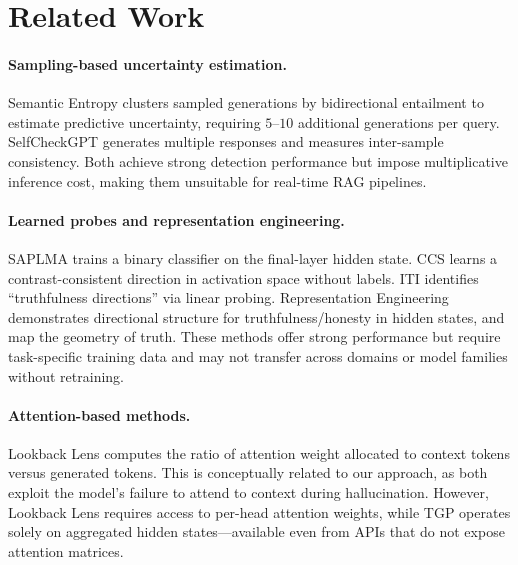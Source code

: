 \documentclass[10pt]{article}
\newcommand{\tgp}{\textsc{TGP}\xspace}
\begin{document}
\section{Related Work}
\label{sec:related}

\paragraph{Sampling-based uncertainty estimation.}
Semantic Entropy \citep{kuhn2023semantic} clusters sampled generations by bidirectional entailment to estimate predictive uncertainty, requiring $5$--$10$ additional generations per query.
SelfCheckGPT \citep{manakul2023selfcheckgpt} generates multiple responses and measures inter-sample consistency.
Both achieve strong detection performance but impose multiplicative inference cost, making them unsuitable for real-time RAG pipelines.

\paragraph{Learned probes and representation engineering.}
SAPLMA \citep{azaria2023internal} trains a binary classifier on the final-layer hidden state.
CCS \citep{burns2022discovering} learns a contrast-consistent direction in activation space without labels.
ITI \citep{li2023inference} identifies ``truthfulness directions'' via linear probing.
Representation Engineering \citep{zou2023representation} demonstrates directional structure for truthfulness/honesty in hidden states, and \citet{marks2023geometry} map the geometry of truth.
These methods offer strong performance but require task-specific training data and may not transfer across domains or model families without retraining.

\paragraph{Attention-based methods.}
Lookback Lens \citep{chuang2024lookback} computes the ratio of attention weight allocated to context tokens versus generated tokens.
This is conceptually related to our approach, as both exploit the model's failure to attend to context during hallucination.
However, Lookback Lens requires access to per-head attention weights, while \tgp operates solely on aggregated hidden states---available even from APIs that do not expose attention matrices.
\end{document}
